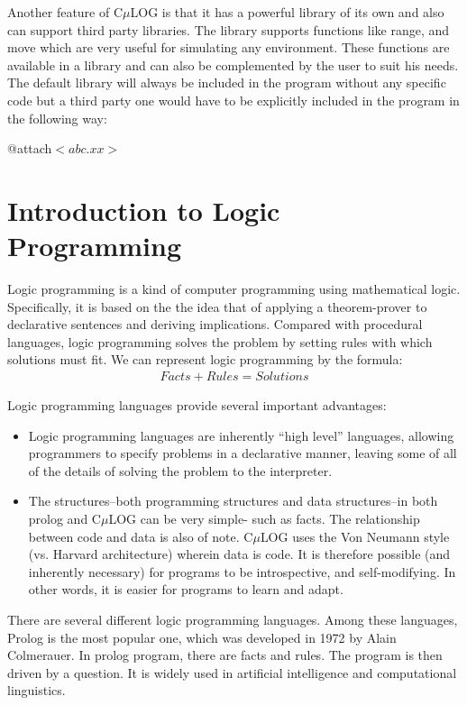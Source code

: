 \documentclass[onecolumn,titlepage]{article}
\begin{document}
Another feature of C$\mu$LOG is that it has a powerful library of its own and also can
support third party libraries. The library supports functions like range, and move
which are very useful for simulating any environment. These functions are available in a
library and can also be complemented by the user to suit his needs. The default library 
will always be included in the program without any specific code but a third party
one would have to be explicitly included in the program in the following way:

@attach$<abc.xx>$


\section{Introduction to Logic Programming}
Logic programming is a kind of computer programming using
mathematical logic. Specifically, it is based on the the idea that
of applying a theorem-prover to declarative
sentences and deriving implications. Compared with procedural 
languages, logic programming solves the problem by
setting rules with which solutions must fit. We can represent
logic programming by the formula:
\begin{eqnarray*}
Facts + Rules = Solutions
\end{eqnarray*}

Logic programming languages provide several important advantages:
\begin{itemize}
\item Logic programming languages are inherently ``high level'' languages, allowing
  programmers to specify problems in a declarative manner, leaving some of all of the
  details of solving the problem to the interpreter.
\item The structures--both programming structures and data structures--in both
  prolog and C$\mu$LOG can be very simple- such as facts.  The
  relationship between code and data is also of note.  C$\mu$LOG uses the Von Neumann
  style (vs. Harvard architecture) wherein data is code.  It is therefore possible 
  (and inherently necessary) for programs to be introspective, and self-modifying.
  In other words, it is easier for programs to learn and adapt.
\end{itemize}
		
There are several different logic programming languages.
Among these languages, Prolog is the most popular one, which was developed
in 1972 by Alain Colmerauer. In prolog program, there are facts and
rules. The program is then driven by a question. It is widely used in 
artificial intelligence and computational linguistics.
\end{document}
